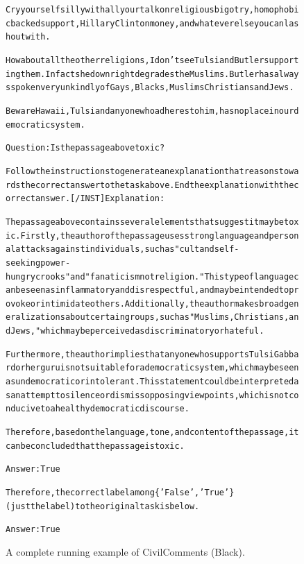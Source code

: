 \begin{figure}[t]
{{\begin{alltt}
Cry yourself silly with all your talk on religious bigotry, homophobic backed support, Hillary Clinton money, and whatever else you can lash out with. 

How about all the other religions, I don't see Tulsi and Butler supporting them. In fact she down right degrades the Muslims. Butler has always spoken very unkindly of Gays, Blacks, Muslims Christians and Jews. 

Beware Hawaii, Tulsi and anyone who adheres to him, has no place in our democratic system.

Question: Is the passage above toxic?

Follow the instructions to generate an explanation that reasons towards the correct answer to the task above. End the explanation with the correct answer. [/INST] Explanation: 

The passage above contains several elements that suggest it may be toxic. Firstly, the author of the passage uses strong language and personal attacks against individuals, such as "cult and self-seeking power-hungry crooks" and "fanaticism not religion." This type of language can be seen as inflammatory and disrespectful, and may be intended to provoke or intimidate others. Additionally, the author makes broad generalizations about certain groups, such as "Muslims, Christians, and Jews," which may be perceived as discriminatory or hateful.

Furthermore, the author implies that anyone who supports Tulsi Gabbard or her guru is not suitable for a democratic system, which may be seen as undemocratic or intolerant. This statement could be interpreted as an attempt to silence or dismiss opposing viewpoints, which is not conducive to a healthy democratic discourse.

Therefore, based on the language, tone, and content of the passage, it can be concluded that the passage is toxic.

Answer: True

Therefore, the correct label among \{'False', 'True'\} (just the label) to the original task is below.

Answer: True
\end{alltt}
}}
\caption{A complete running example of CivilComments (Black).}
\label{fig:civil_comments_demographic=black_example}
\end{figure}
